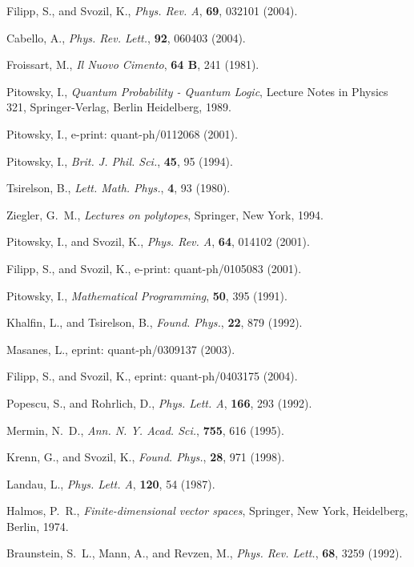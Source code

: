 \documentclass[pra,amsmath,amsfonts,showkeys,showpacs,preprint]{revtex4}
\begin{document}
\begin{thebibliography}{10}
Filipp, S., and Svozil, K., \emph{Phys. Rev. A}, \textbf{69}, 032101 (2004).

Cabello, A., \emph{Phys. Rev. Lett.}, \textbf{92}, 060403 (2004).

Froissart, M., \emph{Il Nuovo Cimento}, \textbf{64 B}, 241 (1981).

Pitowsky, I., \emph{Quantum Probability - Quantum Logic}, Lecture Notes in
  Physics 321, Springer-Verlag, Berlin Heidelberg, 1989.

Pitowsky, I., e-print: quant-ph/0112068 (2001).

Pitowsky, I., \emph{Brit. J. Phil. Sci.}, \textbf{45}, 95 (1994).

Tsirelson, B., \emph{Lett. Math. Phys.}, \textbf{4}, 93 (1980).

Ziegler, G.~M., \emph{Lectures on polytopes}, Springer, New York, 1994.

Pitowsky, I., and Svozil, K., \emph{Phys. Rev. A}, \textbf{64}, 014102 (2001).

Filipp, S., and Svozil, K., e-print: quant-ph/0105083 (2001).

Pitowsky, I., \emph{Mathematical Programming}, \textbf{50}, 395 (1991).

Khalfin, L., and Tsirelson, B., \emph{Found. Phys.}, \textbf{22}, 879
  (1992).

Masanes, L., eprint: quant-ph/0309137 (2003).

Filipp, S., and Svozil, K., eprint: quant-ph/0403175 (2004).

Popescu, S., and Rohrlich, D., \emph{Phys. Lett. A}, \textbf{166}, 293
  (1992).

Mermin, N.~D., \emph{Ann. N. Y. Acad. Sci.}, \textbf{755}, 616 (1995).

Krenn, G., and Svozil, K., \emph{Found. Phys.}, \textbf{28}, 971 (1998).

Landau, L., \emph{Phys. Lett. A}, \textbf{120}, 54 (1987).

Halmos, P.~R., \emph{Finite-dimensional vector spaces}, Springer, New York,
  Heidelberg, Berlin, 1974.

Braunstein, S.~L., Mann, A., and Revzen, M., \emph{Phys. Rev. Lett.},
  \textbf{68}, 3259 (1992).


\end{thebibliography}
\end{document}
